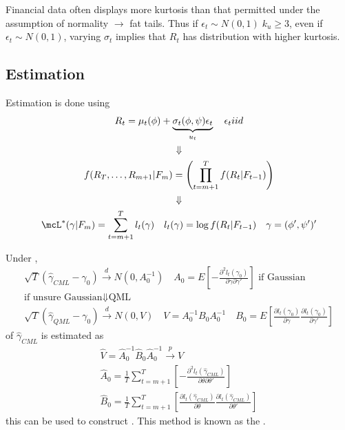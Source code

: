 Financial data often displays more kurtosis than that permitted under the assumption of normality $\to$ fat tails.
Thus if $\epsilon_t \sim N(0,1)\; k_u\geq 3$, even if $\epsilon_t \sim N(0,1)$, varying $\sigma_t$ implies that $R_t$ has  distribution with higher kurtosis.

\subsection{Estimation}

Estimation is done using 
\begin{gather*}
    R_t = \mu_t(\phi) + \underbrace{\sigma_t(\phi,\psi)\epsilon_t}_{u_t}\quad \epsilon_t iid\\
    \Downarrow\\
    f(R_T,\ldots,R_{m+1}|F_m) = \left(\prod_{t=m+1}^{T}f(R_t|F_{t-1})\right)\\
    \Downarrow\\
    \mcL^*(\gamma|F_m) = \sum_{t=m+1}^{T} l_t(\gamma)\quad l_t(\gamma) = \log f(R_t|F_{t-1})\quad \gamma = (\phi',\psi')'
\end{gather*}

Under ,
\begin{gather*}
    \sqrt{T}(\hat{\gamma}_{CML} - \gamma_0) \xrightarrow{d} N(0, A_0^{-1})\quad A_0 = E\left[-\frac{\partial^2 l_t(\gamma_0)}{\partial\gamma\partial\gamma'}\right]\text{ if Gaussian}\\
    \text{if unsure Gaussian} \Downarrow \text{QML}\\
    \sqrt{T}(\hat{\gamma}_{QML} - \gamma_0) \xrightarrow{d} N(0, V)\quad V = A_0^{-1} B_0 A_0^{-1}\quad B_0 = E\left[\frac{\partial l_t(\gamma_0)}{\partial\gamma}\frac{\partial l_t(\gamma_0)}{\partial\gamma'}\right]
\end{gather*}
 of $\hat{\gamma}_{CML}$ is estimated as 
\begin{gather*}
    \hat{V} = \hat{A}_0^{-1} \hat{B}_0 \hat{A}_0^{-1}\xrightarrow{p} V\\
    \hat{A}_0 = \frac{1}{T} \sum_{t=m+1}^{T} \left[-\frac{\partial^2 l_t(\hat{\gamma}_{CML})}{\partial\theta\partial\theta'}\right]\\
    \hat{B}_0 = \frac{1}{T} \sum_{t=m+1}^{T} \left[\frac{\partial l_t(\hat{\gamma}_{CML})}{\partial\theta}\frac{\partial l_t(\hat{\gamma}_{CML})}{\partial\theta'}\right]
\end{gather*}
this can be used to construct .
This method is known as the .


